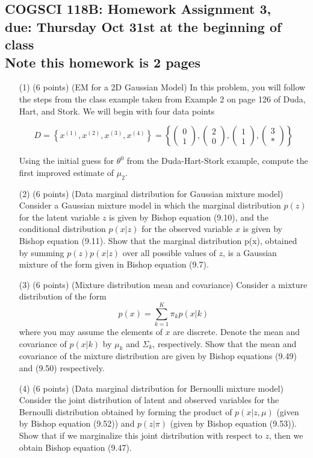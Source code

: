 \documentclass{article}
\newcommand{\tvec}[2]{\ensuremath{\left( \begin{array}{c} 
	{#1} \\
	{#2} 
        \end{array} \right) }}
\begin{document}
\begin{center}
\section*{COGSCI 118B: Homework Assignment 3,\\
          due: Thursday Oct 31st at the beginning of class\\
Note this homework is 2 pages }
\end{center}

\begin{itemize}

\item[(1) (6 points)] (EM for a 2D Gaussian Model)
In this problem, you will follow the steps from the class example taken from Example 2 on page 126 of Duda, Hart, and Stork.  We will begin with four data points

\[ D = \left\{ x^{(1)}, x^{(2)}, x^{(3)}, x^{(4)} \right\} =  \left\{ \tvec{0}{1}, \tvec{2}{0}, \tvec{1}{1}, \tvec{3}{*} \right\} \]

Using the initial guess for $\theta^0$ from the Duda-Hart-Stork example, compute the first improved estimate of $\mu_2$.


\item[(2) (6 points)] (Data marginal distribution for Gaussian mixture model)
Consider a Gaussian mixture model in which the marginal distribution $p(z)$ for the latent variable $z$ is given by Bishop equation (9.10), and the conditional distribution $p(x|z)$ for the observed variable $x$ is given by Bishop equation (9.11).  Show that the marginal distribution p(x), obtained by summing $p(z)p(x|z)$ over all possible values of $z$, is a Gaussian mixture of the form given in Bishop equation (9.7).

\item[(3) (6 points)] (Mixture distribution mean and covariance)
Consider a mixture distribution of the form 
\[ p(x) = \sum_{k=1}^K \pi_k p(x|k) \]
where you may assume the elements of $x$ are discrete. Denote the mean and covariance of $p(x|k)$ by $\mu_k$ and $\Sigma_k$, respectively.  Show that the mean and covariance of the mixture distribution are given by Bishop equations (9.49) and (9.50) respectively.


\item[(4) (6 points)] (Data marginal distribution for Bernoulli mixture model)
Consider the joint distribution of latent and observed variables for the Bernoulli distribution obtained by forming the product of $p(x|z,\mu)$ (given by Bishop equation (9.52)) and $p(z|\pi)$ (given by Bishop equation (9.53)).  Show that if we marginalize this joint distribution with respect to $z$, then we obtain Bishop equation (9.47).



\end{itemize}
\end{document}
